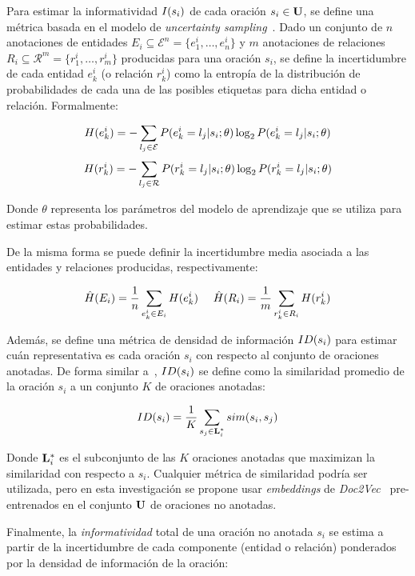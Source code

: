 Para estimar la informatividad $I(s_i)$ de cada oración $s_i \in \mathbf{U}$, se define una métrica basada en el modelo de \textit{uncertainty sampling}~\cite{settles2008analysis}.
Dado un conjunto de $n$ anotaciones de entidades $E_i \subseteq \mathcal{E}^n = \{ e^i_1, \ldots, e^i_n \}$ y $m$ anotaciones de relaciones $R_i \subseteq \mathcal{R}^m = \{ r^i_1, \ldots, r^i_m \}$ producidas para una oración $s_i$, se define la incertidumbre de cada entidad $e^i_k$ (o relación $r^i_k$) como la entropía de la distribución de probabilidades de cada una de las posibles etiquetas para dicha entidad o relación. Formalmente:

\small
$$
    H(e^i_k) = -\sum_{l_j \in \mathcal{E}} P(e^i_k=l_j | s_i;\theta) \log_2 P(e^i_k=l_j | s_i;\theta)
$$
$$
    H(r^i_k) = -\sum_{l_j \in \mathcal{R}} P(r^i_k=l_j | s_i;\theta) \log_2 P(r^i_k=l_j | s_i;\theta)
$$
\normalsize

\noindent
Donde $\theta$ representa los parámetros del modelo de aprendizaje que se utiliza para estimar estas probabilidades.

De la misma forma se puede definir la incertidumbre media asociada a las entidades y relaciones producidas, respectivamente:

\small
$$
    \hat{H}(E_i) = \frac{1}{n} \sum_{e^i_k \in E_i} H(e^i_k) \,\,\,\,\,\,\,\, \hat{H}(R_i) = \frac{1}{m} \sum_{r^i_k \in R_i} H(r^i_k)
$$
\normalsize

Además, se define una métrica de densidad de información $ID(s_i)$ para estimar cuán representativa es cada oración $s_i$
con respecto al conjunto de oraciones anotadas. De forma similar a~\citet{settles2008analysis},
$ID(s_i)$ se define como la similaridad promedio de la oración $s_i$ a un conjunto $K$ de oraciones anotadas:

\small
$$
    ID(s_i) = \frac{1}{K} \sum_{s_j \in \mathbf{L}_i^*} sim(s_i, s_j)
$$
\normalsize

\noindent Donde $\mathbf{L}_i^*$ es el subconjunto de las $K$ oraciones anotadas que maximizan la similaridad con respecto a $s_i$. Cualquier métrica de similaridad podría ser utilizada, pero en esta investigación se propone usar \textit{embeddings} de \textit{Doc2Vec}~\cite{doc2vectgensim}
pre-entrenados en el conjunto $\mathbf{U}$ de oraciones no anotadas.

Finalmente, la \textit{informatividad} total de una oración no anotada $s_i$ se estima a partir de la incertidumbre de cada componente (entidad o relación) ponderados por la densidad de información de la oración:

